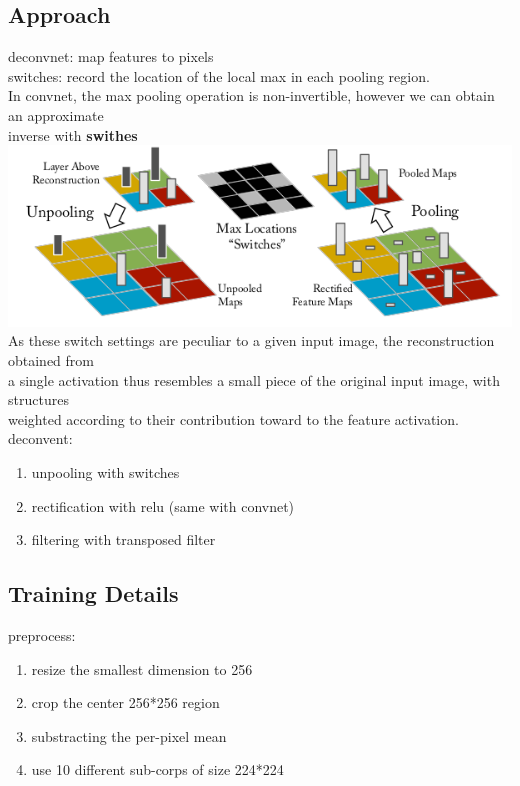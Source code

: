 \documentclass[11pt]{article}
\begin{document}
\subsection{Approach}
\label{sec-3-2}
deconvnet: map features to pixels \\

switches: record the location of the local max in each pooling region. \\

In convnet, the max pooling operation is non-invertible, however we can obtain an approximate \\
inverse with \textbf{swithes} \\
\includegraphics[width=.9\linewidth]{pics/switches.png} \\

As these switch settings are peculiar to a given input image, the reconstruction obtained from \\
a single activation thus resembles a small piece of the original input image, with structures \\
weighted according to their contribution toward to the feature activation. \\

deconvent: \\
\begin{enumerate}
\item unpooling with switches \\
\item rectification with relu (same with convnet) \\
\item filtering with transposed filter \\
\end{enumerate}


\subsection{Training Details}
\label{sec-3-3}
preprocess: \\
\begin{enumerate}
\item resize the smallest dimension to 256 \\
\item crop the center 256*256 region \\
\item substracting the per-pixel mean \\
\item use 10 different sub-corps of size 224*224 \\
\end{enumerate}
\end{document}
